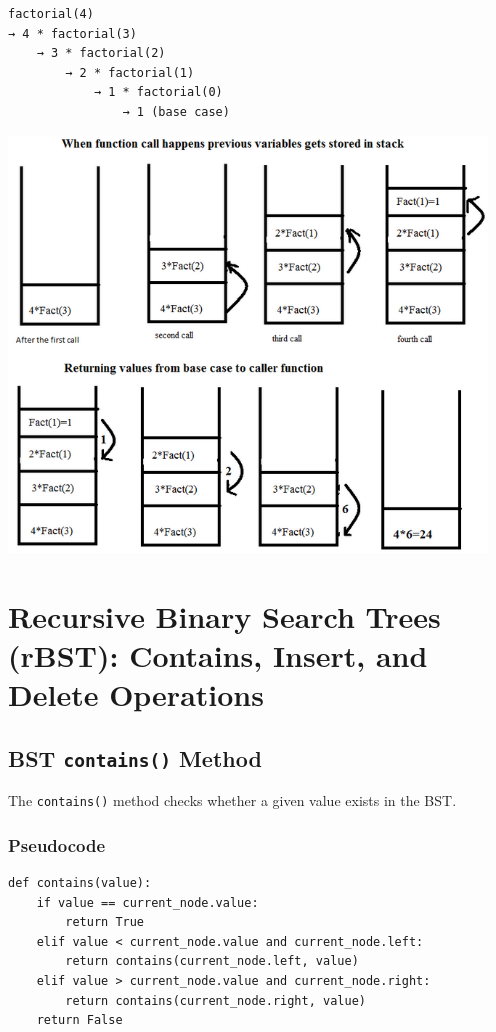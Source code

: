 \begin{verbatim}
factorial(4)
→ 4 * factorial(3)
    → 3 * factorial(2)
        → 2 * factorial(1)
            → 1 * factorial(0)
                → 1 (base case)
\end{verbatim}
\begin{center}
    \includegraphics[width=5in]{../9. rBST/Notes/Assets/Call_Stack}
\end{center}

\section{Recursive Binary Search Trees (rBST): Contains, Insert, and Delete Operations}

\subsection{BST \texttt{contains()} Method}

The \texttt{contains()} method checks whether a given value exists in the BST.

\subsubsection*{Pseudocode}
\begin{verbatim}
def contains(value):
    if value == current_node.value:
        return True
    elif value < current_node.value and current_node.left:
        return contains(current_node.left, value)
    elif value > current_node.value and current_node.right:
        return contains(current_node.right, value)
    return False
\end{verbatim}

